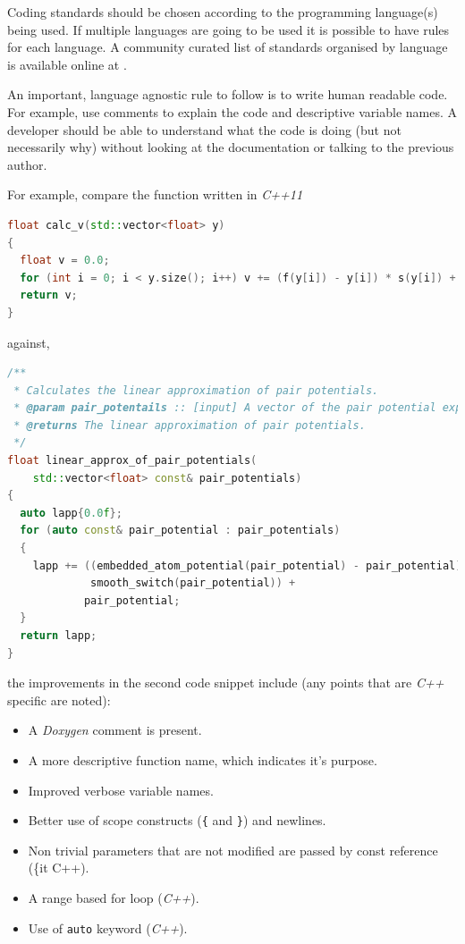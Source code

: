 \documentclass[jnr]{iosart2x}
\begin{document}
Coding standards should be chosen according to the programming language(s) being used.
If multiple languages are going to be used it is possible to have rules for each language.
A community curated list of standards organised by language is available online at \cite{Awesome_Guidelines}.

An important, language agnostic rule to follow is to write human readable code.
For example, use comments to explain the code and descriptive variable names.
A developer should be able to understand what the code is doing (but not necessarily why) without looking at the documentation or talking to the previous author.

For example, compare the function \cite{Lim_2015} written in {\it C++11}

\begin{lstlisting}[frame=single, language=C++]
float calc_v(std::vector<float> y)
{
  float v = 0.0;
  for (int i = 0; i < y.size(); i++) v += (f(y[i]) - y[i]) * s(y[i]) + y[i];
  return v;
}
\end{lstlisting}
against,
\begin{lstlisting}[frame=single, language=C++]
/**
 * Calculates the linear approximation of pair potentials.
 * @param pair_potentails :: [input] A vector of the pair potential experienced by each atom.
 * @returns The linear approximation of pair potentials.
 */
float linear_approx_of_pair_potentials(
    std::vector<float> const& pair_potentials)
{
  auto lapp{0.0f};
  for (auto const& pair_potential : pair_potentials)
  {
    lapp += ((embedded_atom_potential(pair_potential) - pair_potential) *
             smooth_switch(pair_potential)) +
            pair_potential;
  }
  return lapp;
}
\end{lstlisting}

the improvements in the second code snippet include (any points that are {\it C++} specific are noted):
\begin{itemize}
  \item{A {\it Doxygen} \cite{doxygen} comment is present.}
  \item{A more descriptive function name, which indicates it's purpose.}
  \item{Improved verbose variable names.}
  \item{Better use of scope constructs (\texttt{\{} and \texttt{\}}) and newlines.}
  \item{Non trivial parameters that are not modified are passed by const reference (\{it C++}).
  \item{A range based for loop ({\it C++}).}
  \item{Use of \texttt{auto} keyword ({\it C++}).}
\end{itemize}
\end{document}
